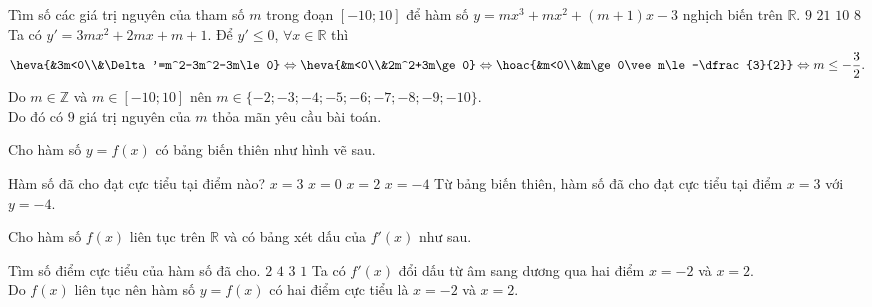 \begin{ex}%
Tìm số các giá trị nguyên của tham số $m$ trong đoạn $[-10;10]$ để hàm số $y=mx^3+mx^2+(m+1)x-3$ nghịch biến trên $\mathbb{R}$.
\choice
{\True $9$}
{$21$}
{$10$}
{$8$}
\loigiai
{
Ta có $y'=3mx^2+2mx+m+1$. Để $y'\le0$, $\forall x\in\mathbb{R}$ thì
\[\heva{&3m<0\\&\Delta'=m^2-3m^2-3m\le0}\Leftrightarrow\heva{&m<0\\&2m^2+3m\ge0}\Leftrightarrow\hoac{&m<0\\&m\ge0\vee m\le -\dfrac{3}{2}}\Leftrightarrow m\le-\dfrac{3}{2}.\]
Do $m\in\mathbb{Z}$ và $m\in[-10;10]$ nên $m\in\{-2;-3;-4;-5;-6;-7;-8;-9;-10\}$.\\
Do đó có $9$ giá trị nguyên của $m$ thỏa mãn yêu cầu bài toán.
}
\end{ex}
\begin{ex}%
Cho hàm số $y=f(x)$ có bảng biến thiên như hình vẽ sau.
\begin{center}
\end{center}
Hàm số đã cho đạt cực tiểu tại điểm nào?
\choice
{\True $x=3$}
{$x=0$}
{$x=2$}
{$x=-4$}
\loigiai
{
Từ bảng biến thiên, hàm số đã cho đạt cực tiểu tại điểm $x=3$ với $y=-4$.
}
\end{ex}
\begin{ex}%
Cho hàm số $f(x)$ liên tục trên $\mathbb{R}$ và có bảng xét dấu của $f'(x)$ như sau.
\begin{center}
\end{center}
Tìm số điểm cực tiểu của hàm số đã cho.
\choice
{\True $2$}
{$4$}
{$3$}
{$1$}
\loigiai
{
Ta có $f'(x)$ đổi dấu từ âm sang dương qua hai điểm $x=-2$ và $x=2$.\\
Do $f(x)$ liên tục nên hàm số $y=f(x)$ có hai điểm cực tiểu là $x=-2$ và $x=2$.
}
\end{ex}
